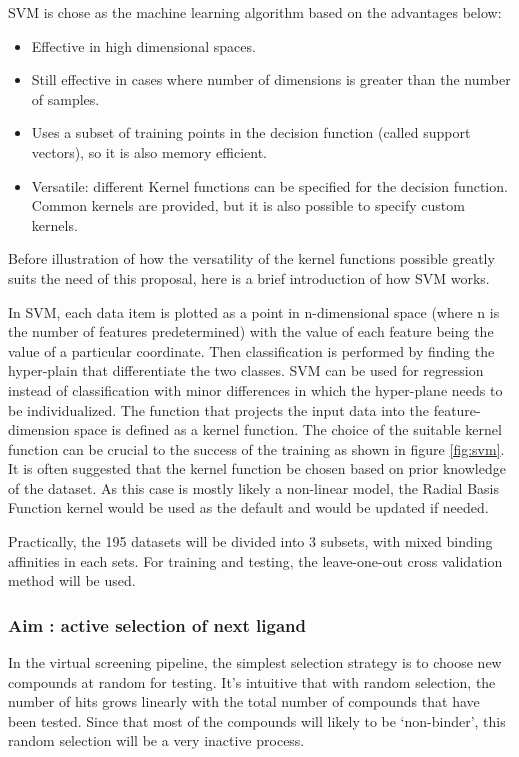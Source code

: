 SVM is chose as the machine learning algorithm based on the advantages below: \cite{svm_sklearn}
\begin{itemize}
	\item Effective in high dimensional spaces.
	\item Still effective in cases where number of dimensions is greater than the number of samples.
	\item Uses a subset of training points in the decision function (called support vectors), so it is also memory efficient.
	\item Versatile: different Kernel functions can be specified for the decision function. Common kernels are provided, but it is also possible to specify custom kernels.
\end{itemize}

Before illustration of how the versatility of the kernel functions possible greatly suits the need of this proposal, here is a brief introduction of how SVM works.

In SVM, each data item is plotted as a point in n-dimensional space (where n is the number of features predetermined) with the value of each feature being the value of a particular coordinate. Then classification is performed by finding the hyper-plain that differentiate the two classes.
SVM can be used for regression instead of classification with minor differences in which the hyper-plane needs to be individualized.
The function that projects the input data into the feature-dimension space is defined as a kernel function. 
The choice of the suitable kernel function can be crucial to the success of the training as shown in figure \ref{fig:svm}.
It is often suggested that the kernel function be chosen based on prior knowledge of the dataset.
As this case is mostly likely a non-linear model, the Radial Basis Function kernel would be used as the default and would be updated if needed.

Practically, the 195 datasets will be divided into 3 subsets, with mixed binding affinities in each sets. For training and testing, the leave-one-out cross validation method will be used.

\subsubsection{Aim : active selection of next ligand}

In the virtual screening pipeline, the simplest selection strategy is to choose new compounds at random for testing. 
It's intuitive that with random selection, the number of hits grows linearly with the total number of compounds that have been tested.
Since that most of the compounds will likely to be `non-binder', this random selection will be a very inactive process.

